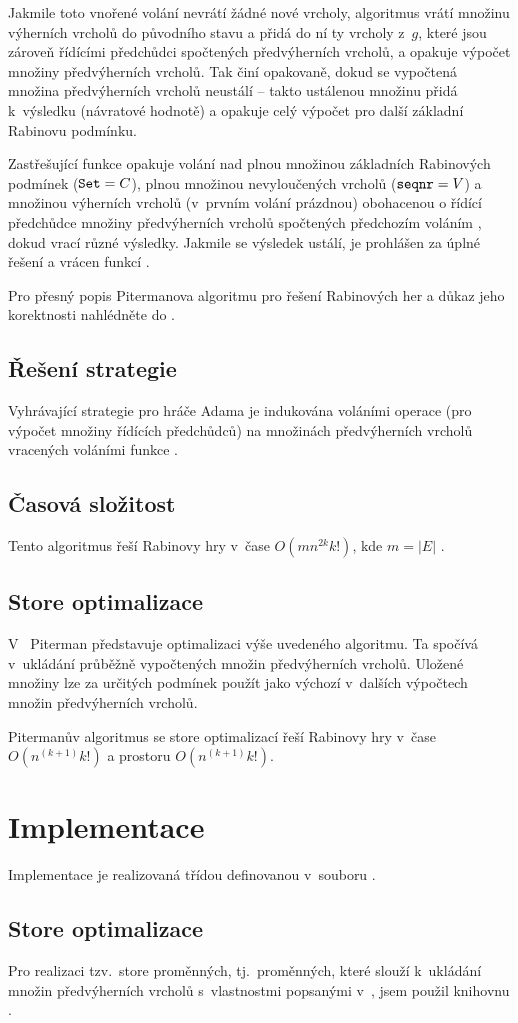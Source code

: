 Jakmile toto vnořené volání nevrátí žádné nové vrcholy, algoritmus vrátí množinu výherních vrcholů  do původního stavu a přidá do ní ty vrcholy z~$g$, které jsou zároveň řídícími předchůdci spočtených předvýherních vrcholů, a opakuje výpočet množiny předvýherních vrcholů. Tak činí opakovaně, dokud se vypočtená množina předvýherních vrcholů neustálí -- takto ustálenou množinu přidá k~výsledku (návratové hodnotě) a opakuje celý výpočet pro další základní Rabinovu podmínku.

Zastřešující funkce  opakuje volání  nad plnou množinou základních Rabinových podmínek ($\texttt{Set} = C$), plnou množinou nevyloučených vrcholů ($\texttt{seqnr} = V$) a množinou výherních vrcholů (v~prvním volání prázdnou) obohacenou o řídící předchůdce množiny předvýherních vrcholů spočtených předchozím voláním , dokud  vrací různé výsledky. Jakmile se výsledek  ustálí, je prohlášen za úplné řešení a vrácen funkcí .

Pro přesný popis Pitermanova algoritmu pro řešení Rabinových her a důkaz jeho korektnosti nahlédněte do \cite{Piterman2006}.
\subsection{Řešení strategie}
Vyhrávající strategie pro hráče Adama je indukována voláními operace  (pro výpočet množiny řídících předchůdců) na množinách předvýherních vrcholů vracených voláními funkce .
\subsection{Časová složitost} \label{subsec:piterman:algoritmus:casovaslozitost}
Tento algoritmus řeší Rabinovy hry v~čase $O(mn^{2k}k!)$, kde $m = |E|$ \cite[s.~16]{Piterman2006}.
\subsection{Store optimalizace} \label{subsec:piterman:algoritmus:store}
V~\cite[kap.~6]{Piterman2006} Piterman představuje optimalizaci výše uvedeného algoritmu. Ta spočívá v~ukládání průběžně vypočtených množin předvýherních vrcholů. Uložené množiny lze za určitých podmínek použít jako výchozí v~dalších výpočtech množin předvýherních vrcholů.

Pitermanův algoritmus se store optimalizací řeší Rabinovy hry v~čase $O(n^{(k+1)}k!)$ a prostoru $O(n^{(k+1)}k!)$.
\section{Implementace}
Implementace je realizovaná třídou  definovanou v~souboru .
\subsection{Store optimalizace}
Pro realizaci tzv.~store proměnných, tj.~proměnných, které slouží k~ukládání množin předvýherních vrcholů s~vlastnostmi popsanými v~\cite[kap.~6]{Piterman2006}, jsem použil knihovnu  \cite{treehh}.